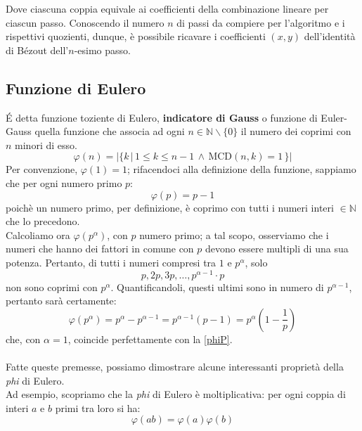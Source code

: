 \documentclass[a4paper,12pt]{article}
\begin{document}
Dove ciascuna coppia equivale ai coefficienti della combinazione lineare per ciascun passo. Conoscendo il numero $n$ di passi da compiere per l'algoritmo e i rispettivi quozienti, dunque, è possibile ricavare i coefficienti $(x,y)$ dell'identità di B\'ezout dell'$n$-esimo passo.

\subsection{Funzione di Eulero}
\'E detta funzione toziente di Eulero, \textbf{indicatore di Gauss} o funzione di Euler-Gauss quella funzione che associa ad ogni $n \in \mathbb{N}\backslash \{0\}$ il numero dei coprimi con $n$ minori di esso.
\begin{equation}\label{phi}
\varphi(n)=\bigg|\{k \, |\, 1 \leq k \leq n-1 \, \land \, \text{MCD}(n,k)=1\, \}\bigg|
\end{equation}
Per convenzione, $\varphi(1)=1$; rifacendoci alla definizione della funzione, sappiamo che per ogni numero primo $p$:
\begin{equation}\label{phiP}
    \varphi(p)=p-1
\end{equation}
poichè un numero primo, per definizione, è coprimo con tutti i numeri interi $\in \mathbb{N}$ che lo precedono.\\
Calcoliamo ora $\varphi(p^\alpha)$, con $p$ numero primo; a tal scopo, osserviamo che i numeri che hanno dei fattori in comune con $p$ devono essere multipli di una sua potenza. Pertanto, di tutti i numeri compresi tra $1$ e $p^\alpha$, solo
\begin{equation*}
    p,2p,3p,\hdots,p^{\alpha-1}\cdot p
\end{equation*}
non sono coprimi con $p^\alpha$. Quantificandoli, questi ultimi sono in numero di $p^{\alpha-1}$, pertanto sarà certamente:
\begin{equation}\label{phiPa}
\varphi(p^\alpha)=p^\alpha-p^{\alpha-1}=p^{\alpha-1}\left(p-1\right)=p^\alpha \left(1-\frac{1}{p}\right)
\end{equation}
che, con $\alpha=1$, coincide perfettamente con la \eqref{phiP}.\\\\
Fatte queste premesse, possiamo dimostrare alcune interessanti proprietà della \emph{phi} di Eulero.\\
Ad esempio, scopriamo che la \emph{phi} di Eulero è moltiplicativa: per ogni coppia di interi $a$ e $b$ primi tra loro si ha:
\begin{equation}\label{phiAB}
\varphi(ab)=\varphi(a)\varphi(b)
\end{equation}
\end{document}
